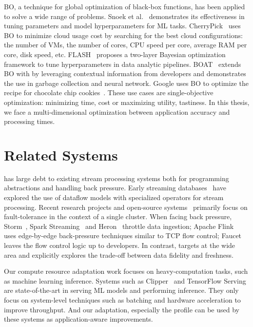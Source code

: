 \documentclass[thesis.tex]{subfiles}
\begin{document}
BO, a technique for global optimization of black-box functions, has been applied
to solve a wide range of problems. Snoek et al.~\cite{snoek2012practical}
demonstrates its effectiveness in tuning parameters and model hyperparameters
for ML tasks. CherryPick~\cite{alipourfard2017cherrypick} uses BO to minimize
cloud usage cost by searching for the best cloud configurations: the number of
VMs, the number of cores, CPU speed per core, average RAM per core, disk speed,
etc. FLASH~\cite{zhang2016flash} proposes a two-layer Bayesian optimization
framework to tune hyperparameters in data analytic
pipelines. BOAT~\cite{dalibard2017boat} extends BO with by leveraging contextual
information from developers and demonstrates the use in garbage collection and
neural network. Google uses BO to optimize the recipe for chocolate chip
cookies~\cite{solnik2017bayesian}. These use cases are single-objective
optimization: minimizing time, cost or maximizing utility, tastiness. In this
thesis, we face a multi-dimensional optimization between application accuracy
and processing times.

\section{Related Systems}
\label{sec:related-systems}

\awstream{} has large debt to existing stream processing systems both for
programming abstractions and handling back pressure. Early streaming
databases~\cite{abadi2005design, chandrasekaran2003telegraphcq} have explored
the use of dataflow models with specialized operators for stream
processing. Recent research projects and open-source
systems~\cite{akidau2013millwheel, toshniwal2014storm, sanjeev2015twitter,
  zaharia2013discretized, carbone2015apache} primarily focus on fault-tolerance
in the context of a single cluster. When facing back pressure,
Storm~\cite{toshniwal2014storm}, Spark Streaming~\cite{zaharia2013discretized}
and Heron~\cite{sanjeev2015twitter} throttle data ingestion; Apache
Flink~\cite{carbone2015apache} uses edge-by-edge back-pressure techniques
similar to TCP flow control; Faucet~\cite{lattuada2016faucet} leaves the flow
control logic up to developers. In contrast, \awstream{} targets at the wide
area and explicitly explores the trade-off between data fidelity and freshness.

Our compute resource adaptation work focuses on heavy-computation tasks, such as
machine learning inference. Systems such as Clipper~\cite{crankshaw2017clipper}
and TensorFlow Serving~\cite{tensorflow2017serving} are state-of-the-art in
serving ML models and performing inference. They only focus on system-level
techniques such as batching and hardware acceleration to improve throughput. And
our adaptation, especially the profile can be used by these systems as
application-aware improvements.
\end{document}
